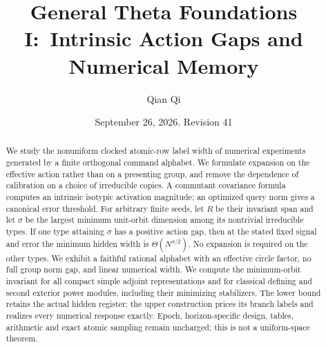 \documentclass[11pt]{amsart}
\title[Intrinsic action and numerical width]{General Theta Foundations I:\
Intrinsic Action Gaps and Numerical Memory}
\author{Qian Qi}
\date{September 26, 2026. Revision 41}
\theoremstyle{definition}\newtheorem{definition}[theorem]{Definition}
\theoremstyle{remark}\newtheorem{remark}[theorem]{Remark}
\begin{document}
\begin{abstract}
We study the nonuniform clocked atomic-row label width of numerical
experiments generated by a finite orthogonal command alphabet. We
formulate expansion on the effective action rather than on a presenting
group, and remove the dependence of calibration on a choice of
irreducible copies. A commutant covariance formula computes an intrinsic
isotypic activation magnitude; an optimized query norm gives a canonical
error threshold. For arbitrary finite seeds, let $R$ be their invariant
span and let $\sigma$ be the largest minimum unit-orbit dimension among
its nontrivial irreducible types. If one type attaining $\sigma$ has a
positive action gap, then at the stated fixed signal and error the
minimum hidden width is $\Theta(N^{\sigma/2})$. No expansion is required
on the other types. We exhibit a faithful rational alphabet with an
effective circle factor, no full group norm gap, and linear numerical
width. We compute the minimum-orbit invariant for all compact simple
adjoint representations and for classical defining and second exterior
power modules, including their minimizing stabilizers. The lower bound
retains the actual hidden register; the upper construction prices its
branch labels and realizes every numerical response exactly. Epoch,
horizon-specific design, tables, arithmetic and exact atomic sampling
remain uncharged; this is not a uniform-space theorem.
\end{abstract}
\maketitle












\appendix






\end{document}
